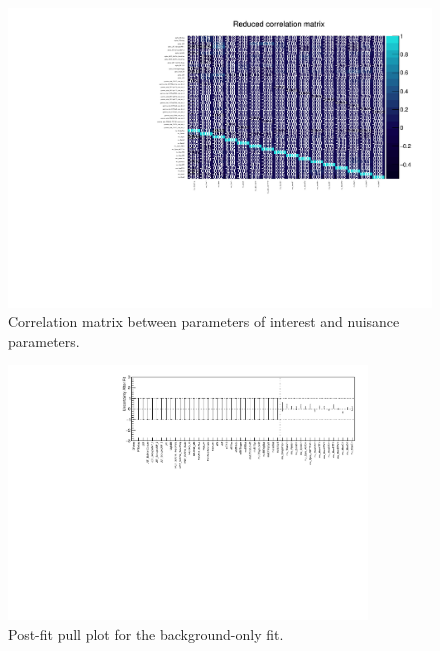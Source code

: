 \clearpage

\begin{figure}
	\begin{center}
		\includegraphics[width=\textwidth]{HistFitterStuff/corrMatrix.pdf}
		\caption{Correlation matrix between parameters of
      interest and nuisance parameters.}
		\label{figure.corrMatrix}
	\end{center}
\end{figure}

\clearpage
\begin{figure}[htbp]
	\begin{center}
		\includegraphics[width=0.85\textwidth]{HistFitterStuff/pullPlot.pdf}
		\caption{Post-fit pull plot for the background-only fit.}
		\label{figure.pullPlot}
	\end{center}
\end{figure}



